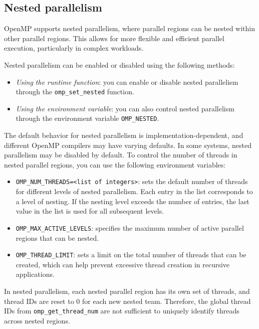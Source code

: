 \subsection{Nested parallelism}
OpenMP supports nested parallelism, where parallel regions can be nested within other parallel regions. 
This allows for more flexible and efficient parallel execution, particularly in complex workloads.

Nested parallelism can be enabled or disabled using the following methods:
\begin{itemize}
    \item \textit{Using the runtime function}: you can enable or disable nested parallelism through the \texttt{omp\_set\_nested} function. 
    \item \textit{Using the environment variable}: you can also control nested parallelism through the environment variable \texttt{OMP\_NESTED}. 
\end{itemize}
The default behavior for nested parallelism is implementation-dependent, and different OpenMP compilers may have varying defaults. 
In some systems, nested parallelism may be disabled by default.
To control the number of threads in nested parallel regions, you can use the following environment variables:
\begin{itemize}
    \item \texttt{OMP\_NUM\_THREADS=<list of integers>}: sets the default number of threads for different levels of nested parallelism. 
        Each entry in the list corresponds to a level of nesting. 
        If the nesting level exceeds the number of entries, the last value in the list is used for all subsequent levels.
    \item \texttt{OMP\_MAX\_ACTIVE\_LEVELS}: specifies the maximum number of active parallel regions that can be nested.
    \item \texttt{OMP\_THREAD\_LIMIT}: sets a limit on the total number of threads that can be created, which can help prevent excessive thread creation in recursive applications.
\end{itemize}
In nested parallelism, each nested parallel region has its own set of threads, and thread IDs are reset to 0 for each new nested team.
Therefore, the global thread IDs from \texttt{omp\_get\_thread\_num} are not sufficient to uniquely identify threads across nested regions.

